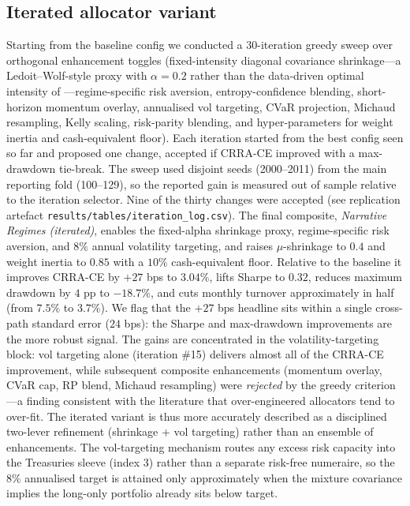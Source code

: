 \documentclass[review,12pt,authoryear]{elsarticle}
\begin{document}
\subsection{Iterated allocator variant}
Starting from the baseline config we conducted a $30$-iteration greedy sweep over
orthogonal enhancement toggles (fixed-intensity diagonal covariance shrinkage---a
Ledoit--Wolf-style proxy with $\alpha=0.2$ rather than the data-driven optimal intensity
of \citet{WolfLedoit2004}---regime-specific risk
aversion, entropy-confidence blending, short-horizon momentum overlay, annualised vol
targeting, CVaR projection, Michaud resampling, Kelly scaling, risk-parity blending, and
hyper-parameters for weight inertia and cash-equivalent floor). Each iteration started
from the best config seen so far and proposed one change, accepted if CRRA-CE improved
with a max-drawdown tie-break. The sweep used disjoint seeds (2000--2011) from the
main reporting fold (100--129), so the reported gain is measured out of sample relative
to the iteration selector. Nine of the thirty changes were accepted (see
replication artefact \texttt{results/tables/iteration\_log.csv}). The final composite,
\emph{Narrative Regimes (iterated)}, enables the fixed-alpha shrinkage proxy, regime-specific
risk aversion, and $8\%$ annual volatility targeting, and raises $\mu$-shrinkage to $0.4$
and weight inertia to $0.85$ with a $10\%$ cash-equivalent floor. Relative to the
baseline it improves CRRA-CE by $+27$ bps to $3.04\%$, lifts Sharpe to
$0.32$, reduces maximum drawdown by $4$ pp to $-18.7\%$, and cuts monthly turnover
approximately in half (from $7.5\%$ to $3.7\%$). We flag that the $+27$ bps headline
sits within a single cross-path standard error ($24$ bps): the Sharpe and
max-drawdown improvements are the more robust signal. The gains are concentrated in the
volatility-targeting block: vol targeting alone (iteration \#15) delivers almost all of
the CRRA-CE improvement, while subsequent composite enhancements (momentum overlay, CVaR
cap, RP blend, Michaud resampling) were \emph{rejected} by the greedy criterion---a
finding consistent with the literature that over-engineered allocators tend to
over-fit. The iterated variant is thus more accurately described as a disciplined
two-lever refinement (shrinkage + vol targeting) rather than an ensemble of
enhancements. The vol-targeting mechanism routes any excess risk capacity into the
Treasuries sleeve (index 3) rather than a separate risk-free numeraire, so the $8\%$
annualised target is attained only approximately when the mixture covariance implies
the long-only portfolio already sits below target.
\end{document}
